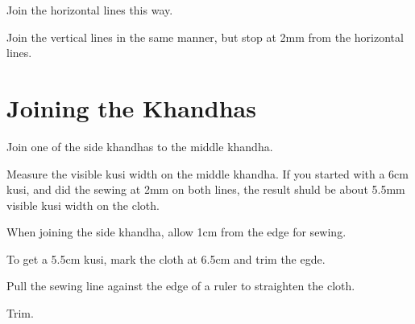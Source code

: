 Join the horizontal lines this way.


Join the vertical lines in the same manner, but stop at 2mm from the
horizontal lines.

\begin{multicols}{2}

\setlength{\nextPhotoWidth}{0.8\linewidth}


\columnbreak

\setlength{\nextPhotoWidth}{\linewidth}


\end{multicols}

\clearpage

\section{Joining the Khandhas}

Join one of the side khandhas to the middle khandha.

\setlength{\nextPhotoWidth}{0.5\textwidth}


Measure the visible kusi width on the middle khandha. If you started
with a 6cm kusi, and did the sewing at 2mm on both lines, the result
shuld be about 5.5mm visible kusi width on the cloth.

When joining the side khandha, allow 1cm from the edge for sewing.

To get a 5.5cm kusi, mark the cloth at 6.5cm and trim the egde.

\setlength{\nextPhotoWidth}{0.4\textwidth}


\clearpage

Pull the sewing line against the edge of a ruler to straighten the
cloth.


Trim.


\clearpage

